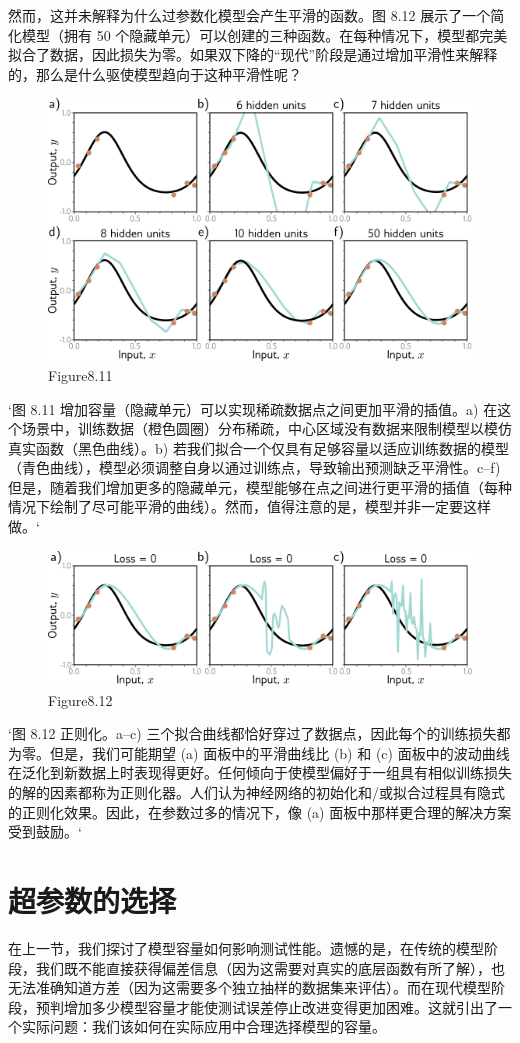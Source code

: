 然而，这并未解释为什么过参数化模型会产生平滑的函数。图 8.12 展示了一个简化模型（拥有 50 个隐藏单元）可以创建的三种函数。在每种情况下，模型都完美拟合了数据，因此损失为零。如果双下降的“现代”阶段是通过增加平滑性来解释的，那么是什么驱使模型趋向于这种平滑性呢？

\begin{figure}[h!]
\centering
\includegraphics[width=0.7\linewidth]{png/chapter8/PerfSmoothness.png}
\caption{Figure8.11}
\end{figure}

`图 8.11 增加容量（隐藏单元）可以实现稀疏数据点之间更加平滑的插值。a) 在这个场景中，训练数据（橙色圆圈）分布稀疏，中心区域没有数据来限制模型以模仿真实函数（黑色曲线）。b) 若我们拟合一个仅具有足够容量以适应训练数据的模型（青色曲线），模型必须调整自身以通过训练点，导致输出预测缺乏平滑性。c–f) 但是，随着我们增加更多的隐藏单元，模型能够在点之间进行更平滑的插值（每种情况下绘制了尽可能平滑的曲线）。然而，值得注意的是，模型并非一定要这样做。`

\begin{figure}[h!]
\centering
\includegraphics[width=0.7\linewidth]{png/chapter8/PerfSmoothness2.png}
\caption{Figure8.12}
\end{figure}

`图 8.12 正则化。a–c) 三个拟合曲线都恰好穿过了数据点，因此每个的训练损失都为零。但是，我们可能期望 (a) 面板中的平滑曲线比 (b) 和 (c) 面板中的波动曲线在泛化到新数据上时表现得更好。任何倾向于使模型偏好于一组具有相似训练损失的解的因素都称为正则化器。人们认为神经网络的初始化和/或拟合过程具有隐式的正则化效果。因此，在参数过多的情况下，像 (a) 面板中那样更合理的解决方案受到鼓励。`
\section{超参数的选择}
在上一节，我们探讨了模型容量如何影响测试性能。遗憾的是，在传统的模型阶段，我们既不能直接获得偏差信息（因为这需要对真实的底层函数有所了解），也无法准确知道方差（因为这需要多个独立抽样的数据集来评估）。而在现代模型阶段，预判增加多少模型容量才能使测试误差停止改进变得更加困难。这就引出了一个实际问题：我们该如何在实际应用中合理选择模型的容量。

